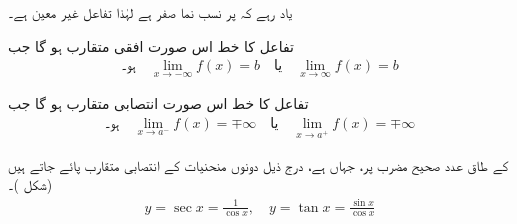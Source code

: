 یاد رہے کہ  پر نسب نما صفر ہے لہٰذا تفاعل غیر معین ہے۔

تفاعل  کا خط  اس صورت افقی متقارب ہو گا جب 
\begin{align*}
\text{ہو۔}\quad \lim_{x\to -\infty} f(x)=b\quad \text{یا}\quad \lim_{x\to \infty} f(x)=b
\end{align*}

تفاعل  کا خط  اس صورت انتصابی متقارب ہو گا جب 
\begin{align*}
\text{ہو۔}\quad \lim_{x\to a^-} f(x)=\mp \infty\quad \text{یا}\quad \lim_{x\to a^+} f(x)=\mp \infty
\end{align*}

 کے طاق عدد صحیح مضرب پر، جہاں  ہے، درج ذیل دونوں منحنیات کے انتصابی متقارب  پائے جاتے ہیں (شکل )۔
\begin{align*}
y=\sec x=\frac{1}{\cos x},\quad y=\tan x=\frac{\sin x}{\cos x}
\end{align*}

